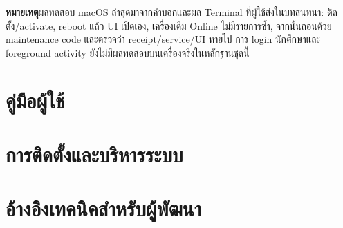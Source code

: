 \documentclass[10pt,a4paper,oneside]{book}
\newcommand{\note}[1]{\par\noindent\colorbox{pale}{\parbox{0.955\linewidth}{\textbf{หมายเหตุ}\quad #1}}\par}
\begin{document}
\note{ผลทดสอบ macOS ล่าสุดมาจากคำบอกและผล Terminal ที่ผู้ใช้ส่งในบทสนทนา: ติดตั้ง/activate, reboot แล้ว UI เปิดเอง, เครื่องเดิม Online ไม่มีรายการซ้ำ, จากนั้นถอนด้วย maintenance code และตรวจว่า receipt/service/UI หายไป การ login นักศึกษาและ foreground activity ยังไม่มีผลทดสอบบนเครื่องจริงในหลักฐานชุดนี้}
\tableofcontents
\mainmatter
\part{คู่มือผู้ใช้}

\part{การติดตั้งและบริหารระบบ}

\part{อ้างอิงเทคนิคสำหรับผู้พัฒนา}

\appendix

\end{document}
